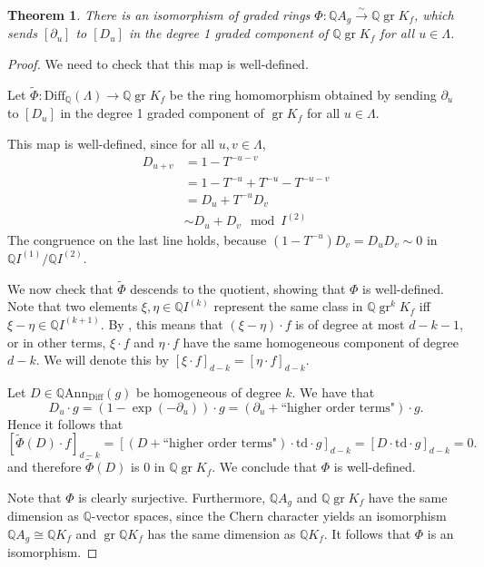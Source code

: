 \documentclass[oneside]{amsart}
\theoremstyle{plain}
\newtheorem{theorem}{Theorem}[section]
\theoremstyle{definition}
\newcommand{\Q}{{\mathbb{Q}}}
\newcommand{\Ann}{{\mathrm{Ann}}}
\newcommand{\Diff}{{\mathrm{Diff}}}
\newcommand{\gr}{\operatorname{gr}}
\newcommand{\td}{{\mathrm{td}}}
\begin{document}
\begin{theorem}\label{thm:ass-graded}
    There is an isomorphism of graded rings $\Phi: \Q A_g \xrightarrow{\sim} \Q \gr K_f$,
    which sends $[\partial_u]$
    to $[D_u]$ in the degree 1 graded component of $\Q \gr K_f$ for all $u \in \Lambda$.
\end{theorem}

\begin{proof}
    We need to check that this map is well-defined.

    Let $\widetilde{\Phi}: \Diff_\Q(\Lambda) \to \Q \gr K_f$ be the ring homomorphism obtained
    by sending $\partial_u$
    to $[D_u]$ in the degree 1 graded component of $\gr K_f$ for all $u \in \Lambda$.
    
    This map is well-defined, since for all $u, v \in \Lambda$,
    \begin{align*}
    D_{u + v} &= 1 - T^{-u-v}\\
    &= 1 - T^{-u} + T^{-u} - T^{-u-v}\\
    &= D_u + T^{-u}D_v\\
    &\sim D_u + D_v\mod I^{(2)}
    \end{align*}
    The congruence on the last line holds, because $(1 - T^{-u})D_v = D_uD_{v} \sim 0$ in $\Q I^{(1)}/\Q I^{(2)}$.

    We now check that $\widetilde{\Phi}$ descends to the quotient, showing that $\Phi$ is well-defined.
    Note that two elements $\xi, \eta \in \Q I^{(k)}$ represent the same class in $\Q \gr^k K_f$ iff $\xi - \eta \in \Q I^{(k + 1)}$.
    By , this means
    that $(\xi - \eta) \cdot f$ is of degree at most $d - k - 1$, or in other terms, 
    $\xi \cdot f$ and $\eta \cdot f$ have the same homogeneous component of degree $d - k$.
    We will denote this by $[\xi \cdot f]_{d - k} = [\eta \cdot f]_{d - k}$.
    
    Let $D \in \Q \Ann_\Diff(g)$ be homogeneous of degree $k$. We have that
    \[
        D_u \cdot g = (1 - \exp(-\partial_u)) \cdot g = (\partial_u + \textrm{``higher order terms"}) \cdot g.
    \]
    Hence it follows that
    \[
        [\widetilde{\Phi}(D) \cdot f]_{d - k} = [(D + \textrm{``higher order terms"}) \cdot \td \cdot g]_{d - k}
        = [D \cdot \td \cdot g]_{d - k} = 0.
    \]
    and therefore $\widetilde{\Phi}(D)$ is $0$ in $\Q \gr K_f$. We conclude that $\Phi$ is well-defined.

    Note that $\Phi$ is clearly surjective. Furthermore, $\Q A_g$ and $\Q \gr K_f$ have the same dimension as $\Q$-vector spaces, since the Chern character yields an isomorphism $\Q A_g \cong \Q K_f$ and $\gr \Q K_f$ has the same dimension as $\Q K_f$. It follows that $\Phi$ is an isomorphism.
\end{proof}
\end{document}
